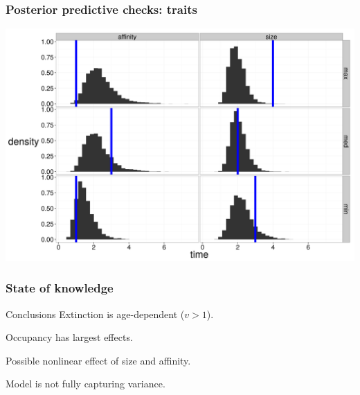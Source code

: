 \documentclass{beamer}
\begin{document}
\begin{frame}
  \frametitle{Posterior predictive checks: traits} 
  \begin{center}
    \includegraphics[height = 0.8\textheight, width = \textwidth, keepaspectratio = true]{figure/bio_ppc}
  \end{center}
\end{frame}

\begin{frame}
  \frametitle{State of knowledge}

  \begin{block}{Conclusions}
    Extinction is age-dependent (\(v > 1\)).

    Occupancy has largest effects.

    Possible nonlinear effect of size and affinity.

    Model is not fully capturing variance.
  \end{block}
\end{frame}
\end{document}
